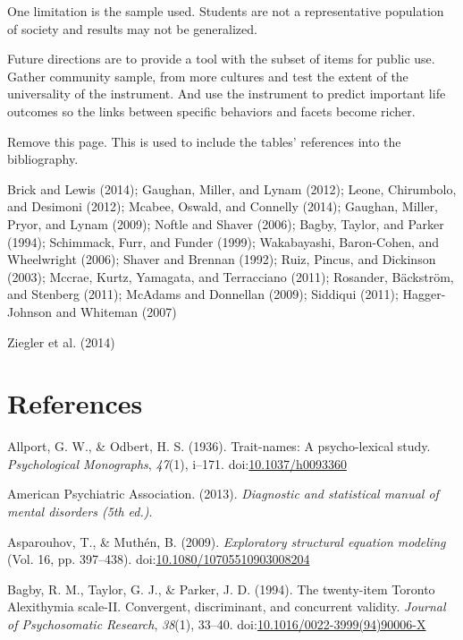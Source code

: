 \documentclass[,man]{apa6}
\theoremstyle{definition}
\theoremstyle{definition}
\theoremstyle{definition}
\theoremstyle{remark}
\begin{document}
One limitation is the sample used. Students are not a representative
population of society and results may not be generalized.

Future directions are to provide a tool with the subset of items for
public use. Gather community sample, from more cultures and test the
extent of the universality of the instrument. And use the instrument to
predict important life outcomes so the links between specific behaviors
and facets become richer.

\newpage

Remove this page. This is used to include the tables' references into
the bibliography.

Brick and Lewis (2014); Gaughan, Miller, and Lynam (2012); Leone,
Chirumbolo, and Desimoni (2012); Mcabee, Oswald, and Connelly (2014);
Gaughan, Miller, Pryor, and Lynam (2009); Noftle and Shaver (2006);
Bagby, Taylor, and Parker (1994); Schimmack, Furr, and Funder (1999);
Wakabayashi, Baron-Cohen, and Wheelwright (2006); Shaver and Brennan
(1992); Ruiz, Pincus, and Dickinson (2003); Mccrae, Kurtz, Yamagata, and
Terracciano (2011); Rosander, Bäckström, and Stenberg (2011); McAdams
and Donnellan (2009); Siddiqui (2011); Hagger-Johnson and Whiteman
(2007)

Ziegler et al. (2014)

\newpage

\hypertarget{references}{%
\section{References}\label{references}}

\begingroup
\setlength{\parindent}{-0.5in}
\setlength{\leftskip}{0.5in}

\hypertarget{refs}{}
\leavevmode\hypertarget{ref-AllportOdbert1936}{}%
Allport, G. W., \& Odbert, H. S. (1936). Trait-names: A psycho-lexical
study. \emph{Psychological Monographs}, \emph{47}(1), i--171.
doi:\href{https://doi.org/10.1037/h0093360}{10.1037/h0093360}

\leavevmode\hypertarget{ref-APA2013}{}%
American Psychiatric Association. (2013). \emph{Diagnostic and
statistical manual of mental disorders (5th ed.)}.

\leavevmode\hypertarget{ref-AsparouhovMuthen2009}{}%
Asparouhov, T., \& Muthén, B. (2009). \emph{Exploratory structural
equation modeling} (Vol. 16, pp. 397--438).
doi:\href{https://doi.org/10.1080/10705510903008204}{10.1080/10705510903008204}

\leavevmode\hypertarget{ref-Bagby1994}{}%
Bagby, R. M., Taylor, G. J., \& Parker, J. D. (1994). The twenty-item
Toronto Alexithymia scale-II. Convergent, discriminant, and concurrent
validity. \emph{Journal of Psychosomatic Research}, \emph{38}(1),
33--40.
doi:\href{https://doi.org/10.1016/0022-3999(94)90006-X}{10.1016/0022-3999(94)90006-X}
\end{document}
